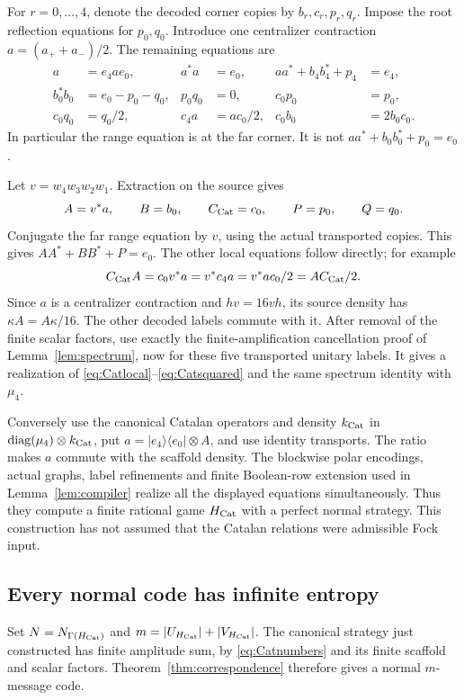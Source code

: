 For $r=0,\ldots,4$, denote the decoded corner copies by $b_r,c_r,p_r,q_r$. Impose the root reflection equations for $p_0,q_0$. Introduce one centralizer contraction $a=(a_++a_-)/2$. The remaining equations are
\begin{align}
 a&=e_4ae_0,&a^*a&=e_0,&aa^*+b_4b_4^*+p_4&=e_4,\label{eq:Catasm1}\\
 b_0^*b_0&=e_0-p_0-q_0,&p_0q_0&=0,&c_0p_0&=p_0,\label{eq:Catasm2}\\
 c_0q_0&=q_0/2,&c_4a&=ac_0/2,&c_0b_0&=2b_0c_0.\label{eq:Catasm3}
\end{align}
In particular the range equation is at the far corner. It is not $aa^*+b_0b_0^*+p_0=e_0$.

Let $v=w_4w_3w_2w_1$. Extraction on the source gives
\[
 A=v^*a,\qquad B=b_0,\qquad C_{\mathrm{Cat}}=c_0,\qquad P=p_0,\qquad Q=q_0.
\]
Conjugate the far range equation by $v$, using the actual transported copies. This gives $AA^*+BB^*+P=e_0$. The other local equations follow directly; for example
\[
 C_{\mathrm{Cat}} A=c_0v^*a=v^*c_4a=v^*ac_0/2=AC_{\mathrm{Cat}}/2.
\]
Since $a$ is a centralizer contraction and $hv=16vh$, its source density has $\kappa A=A\kappa/16$. The other decoded labels commute with it. After removal of the finite scalar factors, use exactly the finite-amplification cancellation proof of Lemma~\ref{lem:spectrum}, now for these five transported unitary labels. It gives a realization of \eqref{eq:Catlocal}--\eqref{eq:Catsquared} and the same spectrum identity with $\mu_4$.

Conversely use the canonical Catalan operators and density $k_{\mathrm{Cat}}$ in $\operatorname{diag}(\mu_4)\otimes k_{\mathrm{Cat}}$, put $a=|e_4\rangle\langle e_0|\otimes A$, and use identity transports. The ratio makes $a$ commute with the scaffold density. The blockwise polar encodings, actual graphs, label refinements and finite Boolean-row extension used in Lemma~\ref{lem:compiler} realize all the displayed equations simultaneously. Thus they compute a finite rational game $H_{\mathrm{Cat}}$ with a perfect normal strategy. This construction has not assumed that the Catalan relations were admissible Fock input.

\subsection{Every normal code has infinite entropy}
Set $N=N_{\Gamma(H_{\mathrm{Cat}})}$ and $m=|U_{H_{\mathrm{Cat}}}|+|V_{H_{\mathrm{Cat}}}|$. The canonical strategy just constructed has finite amplitude sum, by \eqref{eq:Catnumbers} and its finite scaffold and scalar factors. Theorem~\ref{thm:correspondence} therefore gives a normal $m$-message code.

